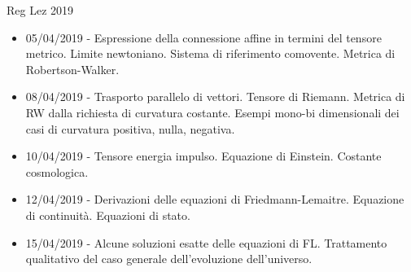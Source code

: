 \begin{frame}[allowframebreaks]{Reg Lez 2019}
\begin{itemize}
\item 05/04/2019 - Espressione della connessione affine in termini del tensore metrico. Limite newtoniano. Sistema di riferimento comovente. Metrica di Robertson-Walker.
\item 08/04/2019 - Trasporto parallelo di vettori. Tensore di Riemann. Metrica di RW dalla richiesta di curvatura costante. Esempi mono-bi dimensionali dei casi di curvatura positiva, nulla, negativa.
\item 10/04/2019 - Tensore energia impulso. Equazione di Einstein. Costante cosmologica.
\item 12/04/2019 - Derivazioni delle equazioni di Friedmann-Lemaitre. Equazione di continuità. Equazioni di stato.
\item 15/04/2019 - Alcune soluzioni esatte delle equazioni di FL. Trattamento qualitativo del caso generale dell'evoluzione dell'universo.
\end{itemize}

\end{frame}